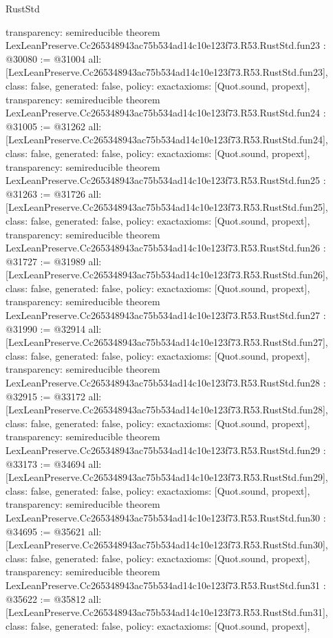 \begin{lexlean}{RustStd}
\begin{coremodule}
{  transparency: semireducible
}
theorem LexLeanPreserve.Cc265348943ac75b534ad14c10e123f73.R53.RustStd.fun23 : @30080 := @31004 {
  all: [LexLeanPreserve.Cc265348943ac75b534ad14c10e123f73.R53.RustStd.fun23],
  class: false,
  generated: false,
  policy: exact{axioms: [Quot.sound, propext]},
  transparency: semireducible
}
theorem LexLeanPreserve.Cc265348943ac75b534ad14c10e123f73.R53.RustStd.fun24 : @31005 := @31262 {
  all: [LexLeanPreserve.Cc265348943ac75b534ad14c10e123f73.R53.RustStd.fun24],
  class: false,
  generated: false,
  policy: exact{axioms: [Quot.sound, propext]},
  transparency: semireducible
}
theorem LexLeanPreserve.Cc265348943ac75b534ad14c10e123f73.R53.RustStd.fun25 : @31263 := @31726 {
  all: [LexLeanPreserve.Cc265348943ac75b534ad14c10e123f73.R53.RustStd.fun25],
  class: false,
  generated: false,
  policy: exact{axioms: [Quot.sound, propext]},
  transparency: semireducible
}
theorem LexLeanPreserve.Cc265348943ac75b534ad14c10e123f73.R53.RustStd.fun26 : @31727 := @31989 {
  all: [LexLeanPreserve.Cc265348943ac75b534ad14c10e123f73.R53.RustStd.fun26],
  class: false,
  generated: false,
  policy: exact{axioms: [Quot.sound, propext]},
  transparency: semireducible
}
theorem LexLeanPreserve.Cc265348943ac75b534ad14c10e123f73.R53.RustStd.fun27 : @31990 := @32914 {
  all: [LexLeanPreserve.Cc265348943ac75b534ad14c10e123f73.R53.RustStd.fun27],
  class: false,
  generated: false,
  policy: exact{axioms: [Quot.sound, propext]},
  transparency: semireducible
}
theorem LexLeanPreserve.Cc265348943ac75b534ad14c10e123f73.R53.RustStd.fun28 : @32915 := @33172 {
  all: [LexLeanPreserve.Cc265348943ac75b534ad14c10e123f73.R53.RustStd.fun28],
  class: false,
  generated: false,
  policy: exact{axioms: [Quot.sound, propext]},
  transparency: semireducible
}
theorem LexLeanPreserve.Cc265348943ac75b534ad14c10e123f73.R53.RustStd.fun29 : @33173 := @34694 {
  all: [LexLeanPreserve.Cc265348943ac75b534ad14c10e123f73.R53.RustStd.fun29],
  class: false,
  generated: false,
  policy: exact{axioms: [Quot.sound, propext]},
  transparency: semireducible
}
theorem LexLeanPreserve.Cc265348943ac75b534ad14c10e123f73.R53.RustStd.fun30 : @34695 := @35621 {
  all: [LexLeanPreserve.Cc265348943ac75b534ad14c10e123f73.R53.RustStd.fun30],
  class: false,
  generated: false,
  policy: exact{axioms: [Quot.sound, propext]},
  transparency: semireducible
}
theorem LexLeanPreserve.Cc265348943ac75b534ad14c10e123f73.R53.RustStd.fun31 : @35622 := @35812 {
  all: [LexLeanPreserve.Cc265348943ac75b534ad14c10e123f73.R53.RustStd.fun31],
  class: false,
  generated: false,
  policy: exact{axioms: [Quot.sound, propext]},
}
\end{coremodule}
\end{lexlean}
